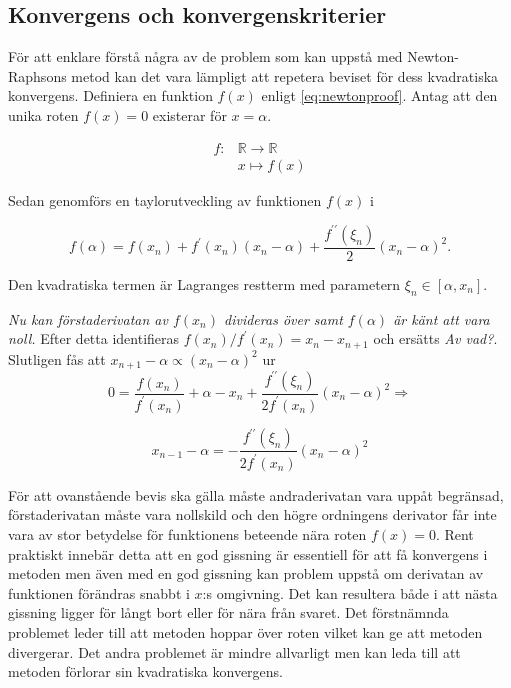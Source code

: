 \subsection{Konvergens och konvergenskriterier}

För att enklare förstå några av de problem som kan uppstå med Newton-Raphsons metod kan det vara lämpligt
att repetera beviset för dess kvadratiska konvergens. Definiera en funktion $f(x)$ enligt \eqref{eq:newtonproof}.
Antag att den unika roten $f(x) = 0$ existerar för $x = \alpha$.

\begin{align}
f: & \mathbb{R} \to \mathbb{R} \nonumber \\
   & x \mapsto f(x) \label{eq:newtonproof}
\end{align}

\noindent
Sedan genomförs en taylorutveckling av funktionen $f(x)$ i 

\begin{equation}
\label{eq:newtonprooftaylor}
f(\alpha) = f(x_n) + f^\prime(x_n)(x_n-\alpha) + \frac{f^{\prime\prime}(\xi_n)}{2}(x_n-\alpha)^2.
\end{equation}

Den kvadratiska termen är Lagranges restterm med parametern $\xi_n \in [\alpha, x_n]$.

\emph{\color{red} Nu kan förstaderivatan av $f(x_n)$ divideras över samt $f(\alpha)$ är känt att vara noll.}
Efter detta identifieras $f(x_n)/f^\prime(x_n) = x_n-x_{n+1}$ och ersätts \emph{\color{red} Av vad?}. Slutligen fås att $x_{n+1}-\alpha \propto (x_{n}-\alpha)^2$ ur
\begin{equation}
0 = \frac{f(x_n)}{f^\prime(x_n)} + \alpha - x_n + \frac{f^{\prime\prime}(\xi_n)}{2f^\prime(x_n)}(x_n-\alpha)^2
\Rightarrow
\end{equation}

\begin{equation}
\label{eq:newtonqed}
x_{n-1} - \alpha = - \frac{f^{\prime\prime}(\xi_n)}{2f^\prime(x_n)}(x_n-\alpha)^2 
\end{equation}

För att ovanstående bevis ska gälla måste andraderivatan vara uppåt begränsad, förstaderivatan måste vara nollskild och den högre ordningens derivator får inte vara av stor betydelse för funktionens beteende nära roten $f(x) = 0$. Rent praktiskt innebär detta att en god gissning är essentiell för att få
konvergens i metoden men även med en god gissning kan problem uppstå om derivatan av funktionen
förändras snabbt i $x$:s omgivning. Det kan resultera både i att nästa gissning ligger för långt
bort eller för nära från svaret. Det förstnämnda problemet leder till att metoden hoppar över roten vilket kan ge att metoden divergerar. Det andra problemet är mindre allvarligt men kan leda till att metoden förlorar sin kvadratiska konvergens.

